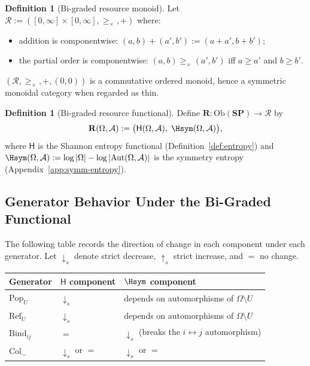 \documentclass[12pt,a4paper]{article}
\theoremstyle{definition}
\newtheorem{definition}[theorem]{Definition}
\theoremstyle{remark}
\newcommand{\Ent}{\ensuremath{\mathsf{H}}}
\newcommand{\SP}{\mathbf{SP}}
\newcommand{\Ob}{\mathrm{Ob}}
\newcommand{\Pop}{\ensuremath{\mathrm{Pop}}}
\newcommand{\RefOp}{\ensuremath{\mathrm{Ref}}}
\newcommand{\Bind}{\ensuremath{\mathrm{Bind}}}
\newcommand{\Col}{\ensuremath{\mathrm{Col}}}
\begin{document}
\begin{definition}[Bi-graded resource monoid]
\label{def:bigraded-monoid}
Let $\mathcal{R}:=([0,\infty]\times[0,\infty],\ge_{\times},+)$ where:
\begin{itemize}
  \item addition is componentwise: $(a,b)+(a',b'):=(a+a',b+b')$;
  \item the partial order is componentwise: $(a,b)\ge_\times(a',b')$ iff
    $a\ge a'$ and $b\ge b'$.
\end{itemize}
$(\mathcal{R},\ge_\times,+,(0,0))$ is a commutative ordered monoid, hence a
symmetric monoidal category when regarded as thin.
\end{definition}

\begin{definition}[Bi-graded resource functional]
\label{def:bigraded-resource}
Define $\mathbf{R}:\Ob(\SP)\to\mathcal{R}$ by
\[
  \mathbf{R}(\Omega,\mathcal{A})
  :=\bigl(\Ent(\Omega,\mathcal{A}),\;\Hsym(\Omega,\mathcal{A})\bigr),
\]
where $\Ent$ is the Shannon entropy functional
(Definition~\ref{def:entropy}) and $\Hsym(\Omega,\mathcal{A}):=
\log|\Omega|-\log|\mathrm{Aut}(\Omega,\mathcal{A})|$ is the symmetry entropy
(Appendix~\ref{app:symm-entropy}).
\end{definition}

\subsection{Generator Behavior Under the Bi-Graded Functional}

The following table records the direction of change in each component under each
generator. Let $\downarrow_s$ denote strict decrease, $\uparrow_s$ strict increase,
and $=$ no change.

\begin{center}
\renewcommand{\arraystretch}{1.4}
\begin{tabular}{lll}
\toprule
\textbf{Generator} & $\Ent$ component & $\Hsym$ component \\
\midrule
$\Pop_U$ & $\downarrow_s$ & depends on automorphisms of $\Omega\setminus U$ \\
$\RefOp_U$ & $\downarrow_s$ & depends on automorphisms of $\Omega\setminus U$ \\
$\Bind_{ij}$ & $=$ & $\downarrow_s$ (breaks the $i\leftrightarrow j$ automorphism) \\
$\Col_\sim$ & $\downarrow_s$ or $=$ & $\downarrow_s$ or $=$ \\
\bottomrule
\end{tabular}
\end{center}
\end{document}
